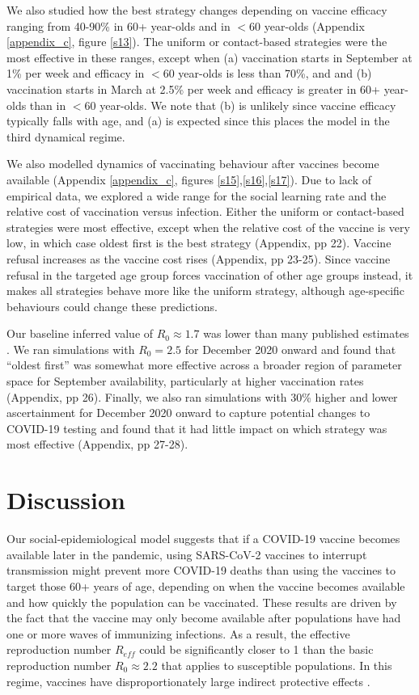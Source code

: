 We also studied how the best strategy changes depending on vaccine efficacy ranging from 40-90\% in 60+ year-olds and in $<60$ year-olds (Appendix \ref{appendix_c}, figure \ref{s13}). The uniform or contact-based strategies were the most effective in these ranges, except when (a) vaccination starts in September at 1\% per week and efficacy in $<60$ year-olds is less than 70\%, and and (b) vaccination starts in March at 2.5\% per week and efficacy is greater in 60+ year-olds than in $<60$ year-olds. We note that (b) is unlikely since vaccine efficacy typically falls with age, and (a) is expected since this places the model in the third dynamical regime. 

We also modelled dynamics of vaccinating behaviour after vaccines become available (Appendix \ref{appendix_c}, figures \ref{s15},\ref{s16},\ref{s17}).  Due to lack of empirical data, we explored a wide range for the social learning rate and the relative cost of vaccination versus infection.  Either the uniform or contact-based strategies were most effective, except when the relative cost of the vaccine is very low, in which case oldest first is the best strategy (Appendix, pp 22). Vaccine refusal increases as the vaccine cost rises (Appendix, pp 23-25). Since vaccine refusal in the targeted age group forces vaccination of other age groups instead, it makes all strategies behave more like the uniform strategy, although age-specific behaviours could change these predictions. 

Our baseline inferred value of $R_0 \approx 1.7$ was lower than many published estimates \cite{hilton2020estimation}.  We ran simulations with $R_0 = 2.5$ for December 2020 onward and found that “oldest first” was somewhat more effective across a broader region of parameter space for September availability, particularly at higher vaccination rates (Appendix, pp 26). Finally, we also ran simulations with 30\% higher and lower ascertainment for December 2020 onward to capture potential changes to COVID-19 testing and found that it had little impact on which strategy was most effective (Appendix, pp 27-28).  

\section{Discussion}

Our social-epidemiological model suggests that if a COVID-19 vaccine becomes available later in the pandemic, using SARS-CoV-2 vaccines to interrupt transmission might prevent more COVID-19 deaths than using the vaccines to target those 60+ years of age, depending on when the vaccine becomes available and how quickly the population can be vaccinated. These results are driven by the fact that the vaccine may only become available after populations have had one or more waves of immunizing infections. As a result, the effective reproduction number $R_{eff}$ could be significantly closer to 1 than the basic reproduction number $R_0 \approx 2.2$ that applies to susceptible populations. In this regime, vaccines have disproportionately large indirect protective effects \cite{anderson1992infectious}.  

